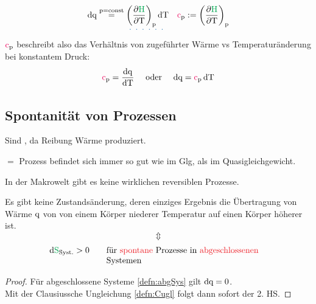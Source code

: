 \begin{defnbox}\nospacing
  \begin{defn}[Wärmekapazität \tc{black}{$\pz=$\normalfont{const}}]
    \begin{align}
      \diff\qp\stackrel{\pz=\text{const}}{=}\uldotted[ulc2]{\left(\pfrac{\Hpot}{\Tz}\right)_{\pz}\diff\Tz}&&\cp:=\left(\pfrac{\Hpot}{\Tz}\right)_{\pz}
    \end{align}
    $\cp$ beschreibt also das Verhältnis von zugeführter Wärme vs Temperaturänderung bei konstantem Druck:
    \begin{align}
      \cp=\frac{\diff\qp}{\diff\Tz}&&\text{ oder }&& \diff\qp=\cp\diff\Tz
    \end{align}
  \end{defn}
\end{defnbox}
\subsection{Spontanität von Prozessen}
\begin{defnbox}\nospacing
  \begin{defn}
    \begin{numberlist}
        \item Sind , da Reibung Wärme produziert.
        \item {} $=$ Prozess befindet sich immer so gut wie im Glg, als im Quasigleichgewicht.
    \end{numberlist}
  \end{defn}
\end{defnbox}
\begin{notebox}[Bemerkung]
  In der Makrowelt gibt es keine wirklichen reversiblen Prozesse.
\end{notebox}
\begin{lawbox}\nospacing
  \begin{law}\label{defn:2Hauptsatz}
    Es gibt keine Zustandsänderung, deren einziges Ergebnis die Übertragung von Wärme $\mathrm{q}$ von von einem Körper
    niederer Temperatur auf einen Körper höherer ist. 
    \[\Updownarrow\]
    \begin{align}
      \diff\Spot_{\text{Syst.}}>0\qquad&\text{für \rd{spontane} Prozesse in \rd{abgeschlossenen}}& \nonumber\nalign
      &\text{Systemen}&
    \end{align}
  \end{law}
\end{lawbox}
\begin{proofbox}
  \begin{proof}
    Für abgeschlossene Systeme \cref{defn:abgSys} gilt $\diff\qp=0$.\\
    Mit der Clausiussche Ungleichung \cref{defn:Cugl} folgt dann sofort der 2. HS.
  \end{proof}
    \end{proofbox}

